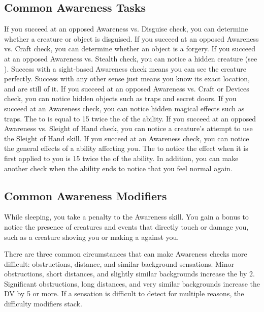     \subsection{Common Awareness Tasks}

         If you succeed at an opposed Awareness vs. Disguise check, you can determine whether a creature or object is disguised.
         If you succeed at an opposed Awareness vs. Craft check, you can determine whether an object is a forgery.
         If you succeed at an opposed Awareness vs. Stealth check, you can notice a hidden creature (see ).
        Success with a sight-based Awareness check means you can see the creature perfectly.
        Success with any other sense just means you know its exact location, and are still \partiallyunaware of it.
         If you succeed at an opposed Awareness vs. Craft or Devices check, you can notice hidden objects such as traps and secret doors.
         If you succeed at an Awareness check, you can notice hidden magical effects such as traps.
        The  to is equal to 15 \add twice the  of the ability.
         If you succeed at an opposed Awareness vs. Sleight of Hand check, you can notice a creature's attempt to use the Sleight of Hand skill.
         If you succeed at an Awareness check, you can notice the general effects of a  ability affecting you.
        The  to notice the effect when it is first applied to you is 15 \add twice the  of the ability.
        In addition, you can make another check when the ability ends to notice that you feel normal again.

    \subsection{Common Awareness Modifiers}\label{Common Awareness Modifiers}
        While sleeping, you take a  penalty to the Awareness skill.
        You gain a  bonus to notice the presence of creatures and events that directly touch or damage you, such as a creature shoving you or making a  against you.

        There are three common circumstances that can make Awareness checks more difficult: obstructions, distance, and similar background sensations.
        Minor obstructions, short distances, and slightly similar backgrounds increase the  by 2.
        Significant obstructions, long distances, and very similar backgrounds increase the DV by 5 or more.
        If a sensation is difficult to detect for multiple reasons, the difficulty modifiers stack.

